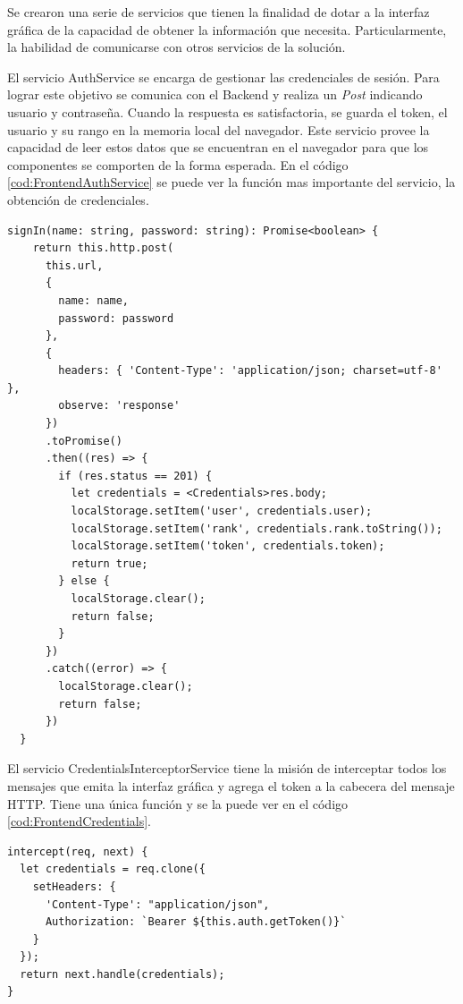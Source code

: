 Se crearon una serie de servicios que tienen la finalidad de dotar a la interfaz gráfica de la capacidad de obtener la información que necesita.
Particularmente, la habilidad de comunicarse con otros servicios de la solución.

El servicio AuthService se encarga de gestionar las credenciales de sesión.
Para lograr este objetivo se comunica con el Backend y realiza un \emph{Post} indicando usuario y contraseña.
Cuando la respuesta es satisfactoria, se guarda el token, el usuario y su rango en la memoria local del navegador.
Este servicio provee la capacidad de leer estos datos que se encuentran en el navegador para que los componentes se comporten de la forma esperada.
En el código \ref{cod:FrontendAuthService} se puede ver la función mas importante del servicio, la obtención de credenciales.


\begin{lstlisting}[label=cod:FrontendAuthService,caption=Obtención de credenciales]
signIn(name: string, password: string): Promise<boolean> {
    return this.http.post(
      this.url,
      {
        name: name,
        password: password
      },
      {
        headers: { 'Content-Type': 'application/json; charset=utf-8' },
        observe: 'response'
      })
      .toPromise()
      .then((res) => {
        if (res.status == 201) {
          let credentials = <Credentials>res.body;
          localStorage.setItem('user', credentials.user);
          localStorage.setItem('rank', credentials.rank.toString());
          localStorage.setItem('token', credentials.token);
          return true;
        } else {
          localStorage.clear();
          return false;
        }
      })
      .catch((error) => {
        localStorage.clear();
        return false;
      })
  }
\end{lstlisting}

El servicio CredentialsInterceptorService tiene la misión de interceptar todos los mensajes que emita la interfaz gráfica y agrega el token a la cabecera del mensaje HTTP.
Tiene una única función y se la puede ver en el código \ref{cod:FrontendCredentials}.

\newpage

\begin{lstlisting}[label=cod:FrontendCredentials,caption=Intercepción de mensajes]
intercept(req, next) {
  let credentials = req.clone({
    setHeaders: {
      'Content-Type': "application/json",
      Authorization: `Bearer ${this.auth.getToken()}`
    }
  });
  return next.handle(credentials);
}
\end{lstlisting}

